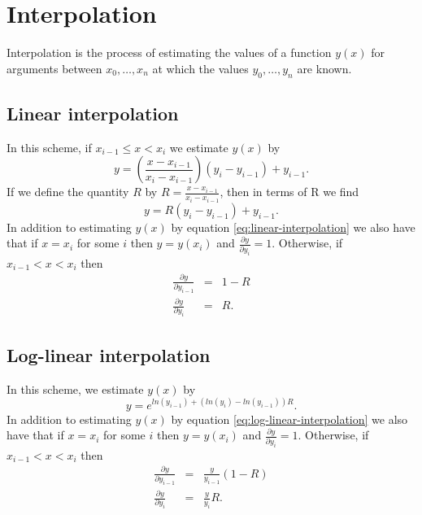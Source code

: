 \documentclass[a4paper]{article}
\begin{document}
\appendix

\section{Interpolation} \label{app:interpolation}
Interpolation is the process of estimating the values of a function $y(x)$ for arguments between $x_{0},\ldots,x_{n}$ at which the values $y_{0},\ldots,y_{n}$ are known.

\subsection{Linear interpolation}
In this scheme, if $x_{i-1} \leq x < x_{i}$ we estimate $y(x)$ by
\[
  y = \left(\frac{x-x_{i-1}}{x_{i}-x_{i-1}}\right)(y_{i}-y_{i-1}) + y_{i-1}.
\]If we define the quantity $R$ by $R = \frac{x-x_{i-1}}{x_{i}-x_{i-1}}$, then in terms of R we find
\begin{equation}
 y = R\label{eq:linear-interpolation}\left(y_{i}-y_{i-1}\right) + y_{i-1}.
\end{equation}
In addition to estimating $y(x)$ by equation \ref{eq:linear-interpolation} we also have that if $x = x_{i}$ for some $i$ then $y = y(x_{i})$ and $\frac{\partial{y}}{\partial{y_{i}}} = 1$. Otherwise, if $x_{i-1} < x < x_{i}$ then 
\begin{eqnarray}
  \frac{\partial{y}}{\partial{y_{i-1}}} & = & 1 - R \\
  \frac{\partial{y}}{\partial{y_{i}}}   & = & R.
\end{eqnarray}

\subsection{Log-linear interpolation}
In this scheme, we estimate $y(x)$ by
\begin{equation}
  y = e^{ln(y_{i-1})+\left(ln(y_{i})-ln(y_{i-1})\right)R}. \label{eq:log-linear-interpolation}
\end{equation}
In addition to estimating $y(x)$ by equation \ref{eq:log-linear-interpolation} we also have that if $x = x_{i}$ for some $i$ then $y = y(x_{i})$ and $\frac{\partial{y}}{\partial{y_{i}}} = 1$. Otherwise, if $x_{i-1} < x < x_{i}$ then 
\begin{eqnarray}
  \frac{\partial{y}}{\partial{y_{i-1}}} & = & \frac{y}{y_{i-1}}(1 - R) \\
  \frac{\partial{y}}{\partial{y_{i}}}   & = & \frac{y}{y_{i}}R.
\end{eqnarray}
\end{document}
